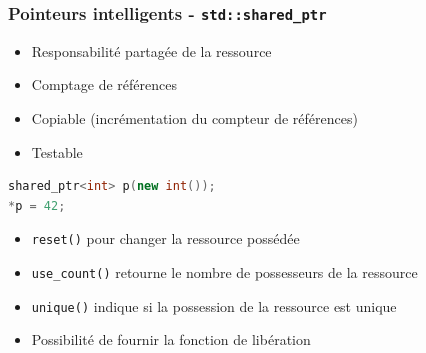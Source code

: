 \documentclass[C++.tex]{subfiles}
\begin{document}
\begin{frame}[fragile]
	\frametitle{Pointeurs intelligents - \lstinline|std::shared_ptr|}
	\begin{itemize}
		\item Responsabilité partagée de la ressource
		\item Comptage de références
		\item Copiable (incrémentation du compteur de références)
		\item Testable
	\end{itemize}

	\begin{lstlisting}[language=C++]
shared_ptr<int> p(new int());
*p = 42;\end{lstlisting}

	\begin{itemize}
		\item \lstinline|reset()| pour changer la ressource possédée


		\item \lstinline|use_count()| retourne le nombre de possesseurs de la ressource
		\item \lstinline|unique()| indique si la possession de la ressource est unique
		\item Possibilité de fournir la fonction de libération
	\end{itemize}
\end{frame}
\end{document}
